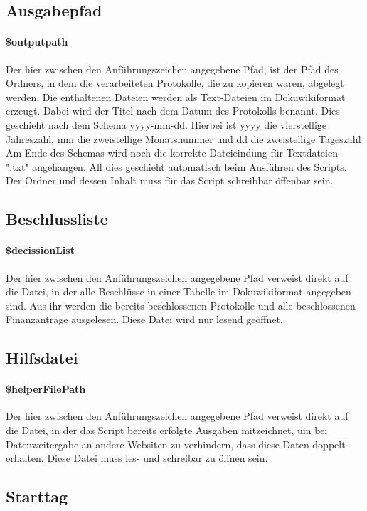 \documentclass[12pt,parskip=full, pagea4]{scrartcl}
\begin{document}
	\subsection{Ausgabepfad}
	\paragraph{\$outputpath} Der hier zwischen den Anführungszeichen angegebene Pfad, ist der Pfad des Ordners, in dem die verarbeiteten Protokolle, die zu kopieren waren, abgelegt werden. Die enthaltenen Dateien werden als Text-Dateien im Dokuwikiformat erzeugt. Dabei wird der Titel nach dem Datum des Protokolls benannt. Dies geschieht nach dem Schema yyyy-mm-dd. Hierbei ist yyyy die vierstellige Jahreszahl, mm die zweistellige Monatsnummer und dd die zweistellige Tageszahl Am Ende des Schemas wird noch die korrekte Dateieindung für Textdateien ".txt" angehangen. All dies geschieht automatisch beim Ausführen des Scripts. Der Ordner und dessen Inhalt muss für das Script schreibbar öffenbar sein.
	
	\subsection{Beschlussliste}
	\paragraph{\$decissionList} Der hier zwischen den Anführungszeichen angegebene Pfad verweist direkt auf die Datei, in der alle Beschlüsse in einer Tabelle im Dokuwikiformat angegeben sind. Aus ihr werden die bereits beschlossenen Protokolle und alle beschlossenen Finanzanträge ausgelesen. Diese Datei wird nur lesend geöffnet. 
	
	\subsection{Hilfsdatei} 
	\paragraph{\$helperFilePath} Der hier zwischen den Anführungszeichen angegebene Pfad verweist direkt auf die Datei, in der das Script bereits erfolgte Ausgaben mitzeichnet, um bei Datenweitergabe an andere Websiten zu verhindern, dass diese Daten doppelt erhalten. Diese Datei muss les- und schreibar zu öffnen sein.
	
	\subsection{Starttag}
\end{document}
